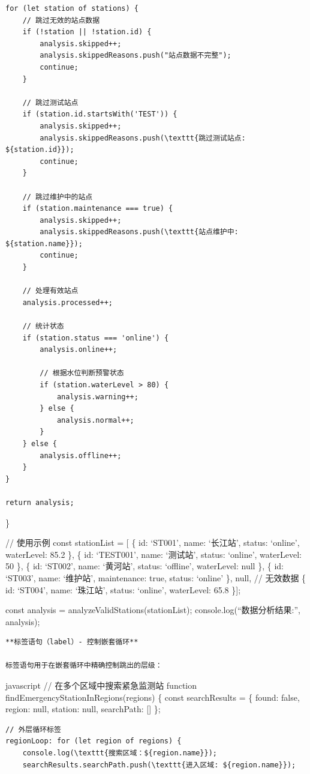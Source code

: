 {\begin{verbatim}
for (let station of stations) {
    // 跳过无效的站点数据
    if (!station || !station.id) {
        analysis.skipped++;
        analysis.skippedReasons.push("站点数据不完整");
        continue;
    }
    
    // 跳过测试站点
    if (station.id.startsWith('TEST')) {
        analysis.skipped++;
        analysis.skippedReasons.push(\texttt{跳过测试站点: ${station.id}});
        continue;
    }
    
    // 跳过维护中的站点
    if (station.maintenance === true) {
        analysis.skipped++;
        analysis.skippedReasons.push(\texttt{站点维护中: ${station.name}});
        continue;
    }
    
    // 处理有效站点
    analysis.processed++;
    
    // 统计状态
    if (station.status === 'online') {
        analysis.online++;
        
        // 根据水位判断预警状态
        if (station.waterLevel > 80) {
            analysis.warning++;
        } else {
            analysis.normal++;
        }
    } else {
        analysis.offline++;
    }
}

return analysis;
\end{verbatim}

\}

// 使用示例 const stationList = {[} \{ id: `ST001', name: `长江站', status: `online', waterLevel: 85.2 \}, \{ id: `TEST001', name: `测试站', status: `online', waterLevel: 50 \}, \{ id: `ST002', name: `黄河站', status: `offline', waterLevel: null \}, \{ id: `ST003', name: `维护站', maintenance: true, status: `online' \}, null, // 无效数据 \{ id: `ST004', name: `珠江站', status: `online', waterLevel: 65.8 \}{]};

const analysis = analyzeValidStations(stationList); console.log(``数据分析结果:'', analysis);

\begin{lstlisting}
**标签语句（label）- 控制嵌套循环**

标签语句用于在嵌套循环中精确控制跳出的层级：
\end{lstlisting}

javascript // 在多个区域中搜索紧急监测站 function findEmergencyStationInRegions(regions) \{ const searchResults = \{ found: false, region: null, station: null, searchPath: {[}{]} \};

\begin{verbatim}
// 外层循环标签
regionLoop: for (let region of regions) {
    console.log(\texttt{搜索区域：${region.name}});
    searchResults.searchPath.push(\texttt{进入区域: ${region.name}});
    

\end{verbatim}}
